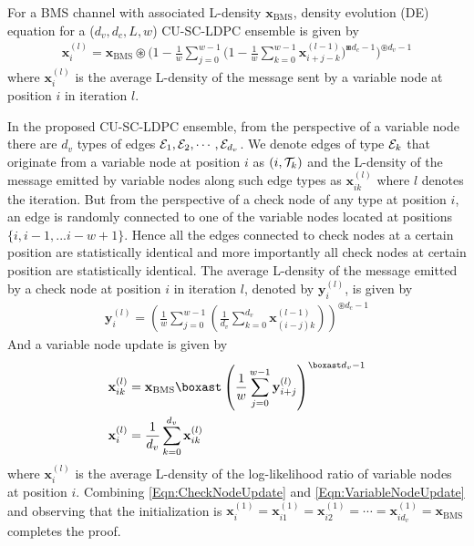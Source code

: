 \documentclass[journal,twocolumn]{IEEEtran}
\begin{document}
\begin{lemma}\label{Lemma:DE_SCLDPC}
For a BMS channel with associated L-density $\mathbf{x}_{\text{BMS}}$\cite{richardson2008modern}, density evolution (DE) equation for a ($d_{v},d_{c},L,w$) CU-SC-LDPC ensemble is given by
\begin{align}
\mathbf{x}_{i}^{(l)}\!=\!\mathbf{x}_{\text{BMS}}\!\circledast\!\bigg( 1-\frac{1}{w}\sum_{j=0}^{w-1}\!\Big(1-\frac{1}{w}\sum_{k=0}^{w-1}\mathbf{x}_{i+j-k}^{(l-1)}\Big)^{\boxast d_{c}-1} \bigg)^{\circledast d_{v}-1}
\label{Eqn:DE_SCLDPC}
\end{align}
where $\mathbf{x}_{i}^{(l)}$ is the average L-density of the message sent by a variable node at position $i$ in iteration $l$.
\end{lemma}
\begin{IEEEproof}
In the proposed CU-SC-LDPC ensemble, from the perspective of a variable node there are $d_{v}$ types of edges $\mathcal{E}_{1},\mathcal{E}_{2},\cdots,\mathcal{E}_{d_{v}}$. We denote edges of type $\mathcal{E}_{k}$ that originate from a variable node at position $i$ as $(i,\mathcal{T}_{k})$ and the L-density of the message emitted by variable nodes along such edge types as $\mathbf{x}_{ik}^{(l)}$ where $l$  denotes the iteration. But from the perspective of a check node of any type at position $i$, an edge is randomly connected to one of the variable nodes located at positions $\{i, i-1,... i-w+1\}$.	Hence all the edges connected to check nodes at a certain position are statistically identical and more importantly all check nodes at certain position are statistically identical. The average L-density of the message emitted by a check node at position $i$ in iteration $l$, denoted by $\mathbf{y}_{i}^{(l)}$, is given by
\begin{align}
\mathbf{y}_{i}^{(l)}=\left(\frac{1}{w}\sum_{j=0}^{w-1}\left(\frac{1}{d_{v}}\sum_{k=0}^{d_{v}}\mathbf{x}_{(i-j)k}^{(l-1)}\right)\right)^{\circledast d_{c}-1}
\label{Eqn:CheckNodeUpdate}
\end{align}
And a variable node update is given by
\begin{align}
\mathbf{x}_{ik}^{(l)}&=\mathbf{x}_{\text{BMS}}\boxast \left(\frac{1}{w}\sum_{j=0}^{w-1}\mathbf{y}_{i+j}^{(l)}\right)^{\boxast d_{v}-1}\label{Eqn:VariableNodeUpdate}\\
\mathbf{x}_{i}^{(l)}&=\frac{1}{d_{v}}\sum_{k=0}^{d_{v}}\mathbf{x}_{ik}^{(l)}\notag
\end{align}
where $\mathbf{x}_{i}^{(l)}$ is the average L-density of the log-likelihood ratio of variable nodes at position $i$.
Combining \eqref{Eqn:CheckNodeUpdate} and \eqref{Eqn:VariableNodeUpdate} and observing that the initialization
is $\mathbf{x}_{i}^{(1)}=\mathbf{x}_{i1}^{(1)}=\mathbf{x}_{i2}^{(1)}=\cdots=\mathbf{x}_{id_{v}}^{(1)}=\mathbf{x}_{\text{BMS}}$ completes the proof.
\end{IEEEproof}
\end{document}
